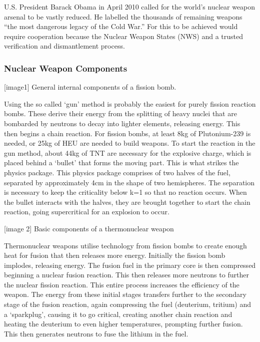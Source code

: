 \documentclass[twoside,titlepage,11pt,twocolumn,a4paper]{article}
\begin{document}
U.S. President Barack Obama in April 2010 called
for the world's nuclear weapon arsenal to be vastly reduced. He
labelled the thousands of remaining weapons ``the most dangerous legacy
of the Cold War.'' For this to be achieved would require cooperation
because the Nuclear Weapon States (NWS) and a trusted verification and
dismantlement process.

\subsubsection{Nuclear Weapon Components}
[image1] General internal components of a fission bomb. \citep{fissionBomb}

Using the so called `gun' method is probably the easiest for 
purely fission reaction bombs. These derive their energy from 
the splitting of heavy nuclei that are bombarded by neutrons to 
decay into lighter elements, releasing energy. This then begins 
a chain reaction. For fission bombs, at least 8kg of Plutonium-239 
is needed, or 25kg of HEU are needed to build weapons. \citep{cochran1995} To 
start the reaction in the gun method, about 44kg of TNT are 
necessary \citep{howToMakeBomb} for the explosive charge, which is placed behind 
a `bullet' that forms the moving part. This is what strikes the 
physics package. This physics package comprises of two halves 
of the fuel, separated by approximately 4cm in the shape of two 
hemispheres. The separation is necessary to keep the criticality 
below k=1 so that no reaction occurs. When the bullet interacts 
with the halves, they are brought together to start the chain 
reaction, going supercritical for an explosion to occur.

[image 2]
Basic components of a thermonuclear weapon \citep{thermonuclearBomb}

Thermonuclear weapons utilise technology from fission bombs to 
create enough heat for fusion that then releases more energy. 
Initially the fission bomb implodes, releasing energy. The fusion 
fuel in the primary core is then compressed beginning a nuclear 
fusion reaction. This then releases more neutrons to further the 
nuclear fission reaction. This entire process increases the 
efficiency of the weapon. The energy from these initial stages 
transfers further to the secondary stage of the fusion reaction, 
again compressing the fuel (deuterium, tritium) and a `sparkplug', 
causing it to go critical, creating another chain reaction and 
heating the deuterium to even higher temperatures, prompting 
further fusion. This then generates neutrons to fuse the lithium 
in the fuel. 
\end{document}
